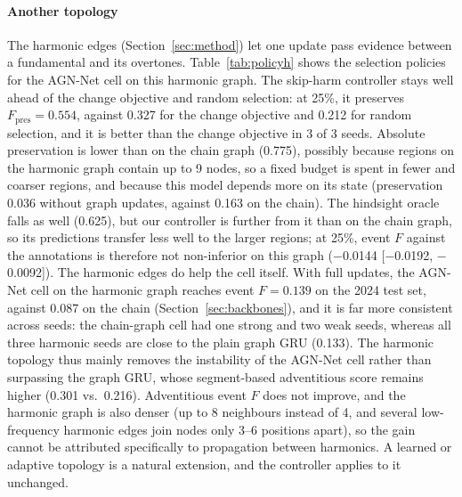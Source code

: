 \paragraph*{Another topology}
\label{sec:harmonic}
The harmonic edges (Section~\ref{sec:method}) let one update pass evidence between a fundamental and its overtones. Table~\ref{tab:policyh} shows the selection policies for the AGN-Net cell on this harmonic graph. The skip-harm controller stays well ahead of the change objective and random selection: at 25\%, it preserves $F_{\mathrm{pres}}=0.554$, against 0.327 for the change objective and 0.212 for random selection, and it is better than the change objective in 3 of 3 seeds. Absolute preservation is lower than on the chain graph (0.775), possibly because regions on the harmonic graph contain up to 9 nodes, so a fixed budget is spent in fewer and coarser regions, and because this model depends more on its state (preservation 0.036 without graph updates, against 0.163 on the chain). The hindsight oracle falls as well (0.625), but our controller is further from it than on the chain graph, so its predictions transfer less well to the larger regions; at 25\%, event $F$ against the annotations is therefore not non-inferior on this graph (\ensuremath{-}0.0144 [\ensuremath{-}0.0192, \ensuremath{-}0.0092]). The harmonic edges do help the cell itself. With full updates, the AGN-Net cell on the harmonic graph reaches event $F=0.139$ on the 2024 test set, against 0.087 on the chain (Section~\ref{sec:backbones}), and it is far more consistent across seeds: the chain-graph cell had one strong and two weak seeds, whereas all three harmonic seeds are close to the plain graph GRU (0.133). The harmonic topology thus mainly removes the instability of the AGN-Net cell rather than surpassing the graph GRU, whose segment-based adventitious score remains higher (0.301 vs.\ 0.216). Adventitious event $F$ does not improve, and the harmonic graph is also denser (up to 8 neighbours instead of 4, and several low-frequency harmonic edges join nodes only 3--6 positions apart), so the gain cannot be attributed specifically to propagation between harmonics. A learned or adaptive topology is a natural extension, and the controller applies to it unchanged.


